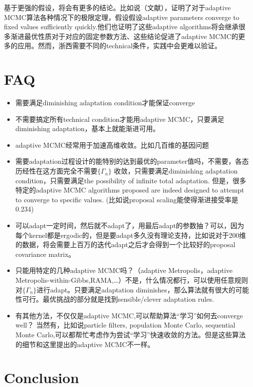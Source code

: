 \documentclass[
]{book}
\providecommand{\tightlist}{%
  \setlength{\itemsep}{0pt}\setlength{\parskip}{0pt}}
\theoremstyle{definition}
\theoremstyle{definition}
\theoremstyle{definition}
\theoremstyle{remark}
\begin{document}
基于更强的假设，将会有更多的结论。比如说（文献），证明了对于adaptive MCMC算法各种情况下的极限定理，假设假设adaptive parameters converge to fixed values sufficiently quickly.他们也证明了这些adaptive algorithms将会继承很多渐进最优性质对于对应的固定参数方法、这些结论促进了adaptive MCMC的更多的应用。然而，浙西需要不同的technical条件，实践中会更难以验证。

\hypertarget{faq}{%
\section{FAQ}\label{faq}}

\begin{itemize}
\tightlist
\item
  需要满足diminishing adaptation condition才能保证converge
\item
  不需要搞定所有technical condition才能用adaptive MCMC，只要满足diminishing adaptation，基本上就能渐进可用。
\item
  adaptive MCMC经常用于加速高维收敛。比如几百维的基因问题
\item
  需要adaptation过程设计的能特别的达到最优的parameter值吗，不需要，各态历经性在这方面完全不需要\(\{\Gamma_n\}\) 收敛，只需要满足diminishing adaptation condition，只需要满足the possibility of infinite total adaptation. 但是，很多特定的adaptive MCMC algorithms proposed are indeed designed to attempt to converge to specific values. (比如说proposal scaling能使得渐进接受率是0.234)
\item
  可以adapt一定时间，然后就不adapt了，用最后adapt的参数抽？可以，因为每个kernel都是ergodic的，但是要adapt多久没有理论支持，比如说对于200维的数据，将会需要上百万的迭代adapt之后才会得到一个比较好的proposal covariance matrix。
\item
  只能用特定的几种adaptive MCMC吗？（adaptive Metropolis，adaptive Metropolis-within-Gibbs,RAMA,\ldots）不是，什么情况都行，可以使用任意规则对\(\{\Gamma_n\}\)进行adapt。只要满足adaptation diminishes，那么算法就有很大的可能性可行。最优挑战的部分就是找到sensible/clever adaptation rules.
\item
  有其他方法，不仅仅是adaptive MCMC,可以帮助算法``学习''如何去converge well？
  当然有，比如说particle filters, population Monte Carlo, sequential Monte Carlo,可以都帮忙考虑作为尝试``学习''快速收敛的方法。但是这些算法的细节和这里提出的adaptive MCMC不一样。
\end{itemize}

\hypertarget{conclusion}{%
\section{Conclusion}\label{conclusion}}
\end{document}
